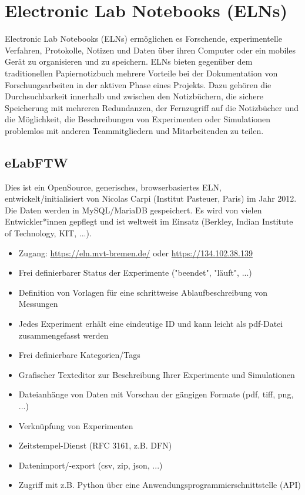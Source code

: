 \section[Electronic Lab Notebooks]{Electronic Lab Notebooks (ELNs)}\label{ssc:ELN}

Electronic Lab Notebooks (ELNs) ermöglichen es Forschende, experimentelle
Verfahren, Protokolle, Notizen und Daten über ihren Computer oder ein mobiles
Gerät zu organisieren und zu speichern. ELNs bieten gegenüber dem traditionellen
Papiernotizbuch mehrere Vorteile bei der Dokumentation von Forschungsarbeiten in
der aktiven Phase eines Projekts. Dazu gehören die Durchsuchbarkeit innerhalb
und zwischen den Notizbüchern, die sichere Speicherung mit mehreren Redundanzen,
der Fernzugriff auf die Notizbücher und die Möglichkeit, die Beschreibungen von
Experimenten oder Simulationen problemlos mit anderen Teammitgliedern und
Mitarbeitenden zu teilen.

\subsection{eLabFTW}

Dies ist ein OpenSource, generisches, browserbasiertes ELN,
entwickelt/initialisiert von Nicolas Carpi (Institut Pasteuer, Paris) im Jahr 2012. Die
Daten werden in MySQL/MariaDB gespeichert. Es wird von vielen Entwickler*innen
gepflegt und ist weltweit im Einsatz (Berkley, Indian Institute of Technology,
KIT, ...).
\begin{itemize}
  \item Zugang: \url{https://eln.mvt-bremen.de/} oder \url{https://134.102.38.139}
  \item Frei definierbarer Status der Experimente ("beendet", "läuft", ...)
  \item Definition von Vorlagen für eine schrittweise Ablaufbeschreibung von
        Messungen
  \item Jedes Experiment erhält eine eindeutige ID und kann leicht als pdf-Datei
        zusammengefasst werden
  \item Frei definierbare Kategorien/Tags
  \item Grafischer Texteditor zur Beschreibung Ihrer Experimente und Simulationen
  \item Dateianhänge von Daten mit Vorschau der gängigen Formate (pdf, tiff,
        png, ...)
  \item Verknüpfung von Experimenten
  \item Zeitstempel-Dienst (RFC 3161, z.B. DFN)
  \item Datenimport/-export (csv, zip, json, ...)
  \item Zugriff mit z.B. Python über eine Anwendungsprogrammierschnittstelle (API)
\end{itemize}

